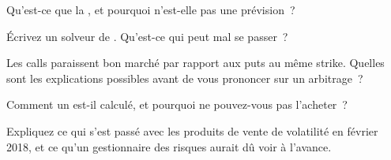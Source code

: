 \begin{interviewq}\label{iq:m1:volatility-first-contact:2}
Qu'est-ce que la , et pourquoi n'est-elle pas une prévision~?
\end{interviewq}

\begin{interviewq}\label{iq:m1:volatility-first-contact:3}
Écrivez un solveur de . Qu'est-ce qui peut mal se passer~?
\end{interviewq}

\begin{interviewq}\label{iq:m1:volatility-first-contact:4}
Les calls paraissent bon marché par rapport aux puts au même strike. Quelles sont les explications
possibles avant de vous prononcer sur un arbitrage~?
\end{interviewq}

\begin{interviewq}\label{iq:m1:volatility-first-contact:5}
Comment un  est-il calculé, et pourquoi ne pouvez-vous pas l'acheter~?
\end{interviewq}

\begin{interviewq}\label{iq:m1:volatility-first-contact:6}
Expliquez ce qui s'est passé avec les produits de vente de volatilité en février 2018, et
ce qu'un gestionnaire des risques aurait dû voir à l'avance.
\end{interviewq}
